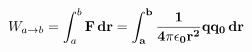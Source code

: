\documentclass[preview]{standalone}
\begin{document}
\begin{align*}
W_{a \rightarrow b} = \int_{a}^{b} \bf{F} \, d \mathbf{r} = \int_{a}^{b} \frac{1}{4 \pi \epsilon_0 r^2} q q_0 \, dr
\end{align*}
\end{document}
